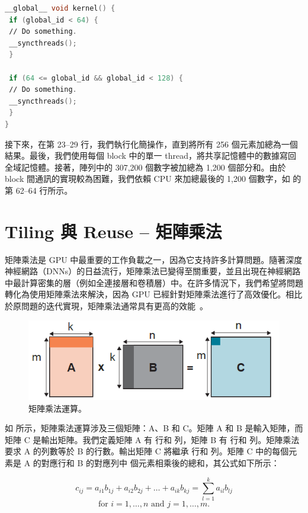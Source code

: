 \begin{lstlisting}[language=C, caption={Barrier 不匹配的範例。}, captionpos=t, label={lst:barrier}]
__global__ void kernel() {
 if (global_id < 64) {
 ∕∕ Do something.
 __syncthreads();
 }

 if (64 <= global_id && global_id < 128) {
 ∕∕ Do something.
 __syncthreads();
 }
}
\end{lstlisting}

接下來，在第 23–29 行，我們執行化簡操作，直到將所有 256 個元素加總為一個結果。最後，我們使用每個 block 中的單一 thread，將共享記憶體中的數據寫回全域記憶體。接著，陣列中的 307,200 個數字被加總為 1,200 個部分和。由於 block 間通訊的實現較為困難，我們依賴 CPU 來加總最後的 1,200 個數字，如  的第 62–64 行所示。

\section{Tiling 與 Reuse – 矩陣乘法}
矩陣乘法是 GPU 中最重要的工作負載之一，因為它支持許多計算問題。隨著深度神經網路（DNNs）的日益流行，矩陣乘法已變得至關重要，並且出現在神經網路中最計算密集的層（例如全連接層和卷積層）中。在許多情況下，我們希望將問題轉化為使用矩陣乘法來解決，因為 GPU 已經針對矩陣乘法進行了高效優化。相比於原問題的迭代實現，矩陣乘法通常具有更高的效能~\cite{Parallel-multi-channel}。

\begin{figure}[h]
    \centering
    \includegraphics[width=0.7\linewidth]{FileAusiliari/Screenshots/Figure8-6.png}
    \caption{矩陣乘法運算。}
    \label{fig:MatrixMultiplication}
\end{figure}

如  所示，矩陣乘法運算涉及三個矩陣：A、B 和 C。矩陣 A 和 B 是輸入矩陣，而矩陣 C 是輸出矩陣。我們定義矩陣 A 有  行和  列，矩陣 B 有  行和  列。矩陣乘法要求 A 的列數等於 B 的行數。輸出矩陣 C 將繼承  行和  列。矩陣 C 中的每個元素是 A 的對應行和 B 的對應列中  個元素相乘後的總和，其公式如下所示：

\[
c_{ij} = a_{i1}b_{1j} + a_{i2}b_{2j} + \dots + a_{ik}b_{kj} = \sum_{l=1}^{k} a_{il}b_{lj}
\]
\[
\text{for } i = 1, \dots, n \text{ and } j = 1, \dots, m.
\]

